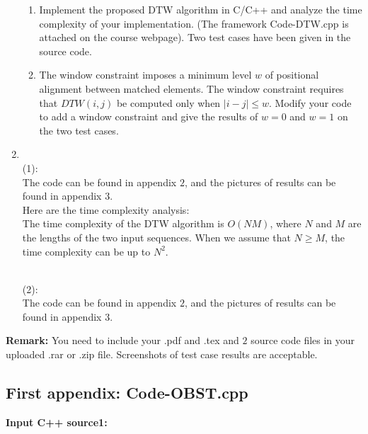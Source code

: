 \documentclass[12pt,a4paper]{article}
\makeatletter
\newtheorem*{solution}{Solution}
\theoremstyle{definition}
\renewenvironment{solution}[1][Solution] {\par\pushQED{\qed}\normalfont\topsep6\p@\@plus6\p@\relax\trivlist\item[\hskip\labelsep\bfseries#1\@addpunct{.}]\ignorespaces}{\popQED\endtrivlist\@endpefalse} \makeatother
\makeatother
\begin{document}
\begin{enumerate}
		\begin{enumerate}
			\item Implement the proposed DTW algorithm in C/C++ and analyze the time complexity of your implementation. ({\color{blue}The framework Code-DTW.cpp is attached on the course webpage}). Two test cases have been given in the source code. 
			\item The window constraint imposes a minimum level $w$ of positional alignment between matched elements. The window constraint requires that $DTW(i, j)$ be computed only when $|i-j| \leq w$. Modify your code to add a window constraint and give the results of $ w=0 $ and $ w=1 $ on the two test cases. 
		\end{enumerate}
		    \begin{solution}
		        \\(1):\\
		        The code can be found in appendix $2$, and the pictures of results can be found in appendix $3$.
		        \\Here are the time complexity analysis: \\
		        The time complexity of the DTW algorithm is  $O\left(NM\right)$, where $N$ and $M$ are the lengths of the two input sequences. When we assume that $ N\geq M$, the time complexity can be up to  $N^2$. 

		        
		        \\(2):\\
                The code can be found in appendix $2$, and the pictures of results can be found in appendix $3$.
		        
		        
		        
		        
		    \end{solution}
		
	\end{enumerate}
	
	\vspace{20pt}
	
	\textbf{Remark:} You need to include your .pdf and .tex and {\color{red}\emph{$2$}} source code files in your uploaded .rar or .zip file. Screenshots of test case results are acceptable.
	


\newpage

\begin{appendices}
\section{First appendix: Code-OBST.cpp}
\textcolor[rgb]{0.98,0.00,0.00}{\textbf{Input C++ source1:}}




%

\end{appendices}
\end{document}
